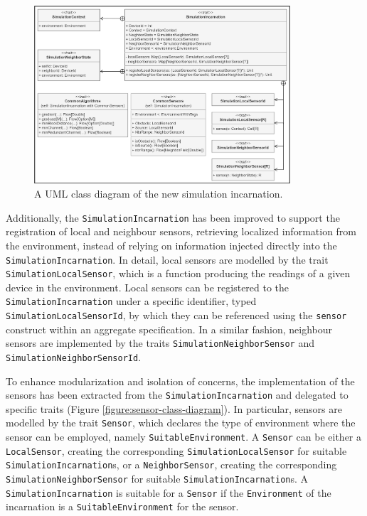 \begin{figure}[!ht]
  \centering
  \includegraphics[width=0.85\textwidth]{resources/figures/simulation-incarnation-class-diagram.png}
  \caption{A UML class diagram of the new simulation incarnation.}
  \label{figure:simulation-incarnation-class-diagram}
\end{figure}

Additionally, the \texttt{SimulationIncarnation} has been improved to support
the registration of local and neighbour sensors, retrieving localized
information from the environment, instead of relying on information injected
directly into the \texttt{Simu\-lationIncarnation}. In detail, local sensors
are modelled by the trait \texttt{Simula\-tionLocalSensor}, which is a function
producing the readings of a given device in the environment. Local sensors can
be registered to the \texttt{SimulationIncar\-nation} under a specific
identifier, typed \texttt{SimulationLocalSensorId}, by which they can be
referenced using the \texttt{sensor} construct within an aggregate
specification. In a similar fashion, neighbour sensors are implemented by the
traits \texttt{SimulationNeighbor\-Sensor} and
\texttt{Simulation\-NeighborSensorId}.

To enhance modularization and isolation of concerns, the implementation of the
sensors has been extracted from the \texttt{SimulationIncarnation} and
delegated to specific traits (Figure \ref{figure:sensor-class-diagram}). In
particular, sensors are modelled by the trait \texttt{Sensor}, which declares
the type of environment where the sensor can be employed, namely
\texttt{SuitableEnviron\-ment}. A \texttt{Sensor} can be either a
\texttt{LocalSensor}, creating the corresponding
\texttt{Simula\-tion\-LocalSensor} for suitable
\texttt{SimulationIncarnation}s, or a \texttt{NeighborSensor}, creating the
corresponding \texttt{SimulationNeighborSensor} for suitable
\texttt{Simulation\-Incarnation}s. A \texttt{SimulationIncarnation} is suitable
for a \texttt{Sensor} if the \texttt{Environ\-ment} of the incarnation is a
\texttt{SuitableEnvironment} for the sensor.

